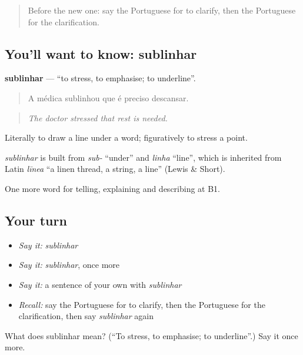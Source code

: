 \begin{quote}
Before the new one: say the Portuguese for to clarify, then the Portuguese for the clarification.
\end{quote}

\subsection*{You'll want to know: sublinhar}
\textbf{sublinhar} — \textquotedblleft{}to stress, to emphasise; to underline\textquotedblright{}.

\begin{quote}
A médica sublinhou que é preciso descansar.
\end{quote}

\begin{quote}
\emph{The doctor stressed that rest is needed.}
\end{quote}

Literally to draw a line under a word; figuratively to stress a point.

\begin{cousinweb}
\emph{sublinhar} is built from \emph{sub-} \textquotedblleft{}under\textquotedblright{} and \emph{linha} \textquotedblleft{}line\textquotedblright{}, which is inherited from Latin \emph{līnea} \textquotedblleft{}a linen thread, a string, a line\textquotedblright{} (Lewis \& Short).
\end{cousinweb}

\begin{grammarlens}[title={What you've built}]
One more word for telling, explaining and describing at B1.
\end{grammarlens}

\subsection*{Your turn}
\begin{itemize}
\raggedright
  \item \emph{Say it:} \emph{sublinhar}
  \item \emph{Say it:} \emph{sublinhar}, once more
  \item \emph{Say it:} a sentence of your own with \emph{sublinhar}
  \item \emph{Recall:} say the Portuguese for to clarify, then the Portuguese for the clarification, then say \emph{sublinhar} again
\end{itemize}

\begin{tcolorbox}[breakable,colback=teal!4,colframe=teal!35!black,title={Before you move on}]
What does sublinhar mean? (\textquotedblleft{}To stress, to emphasise; to underline\textquotedblright{}.) Say it once more.
\end{tcolorbox}
